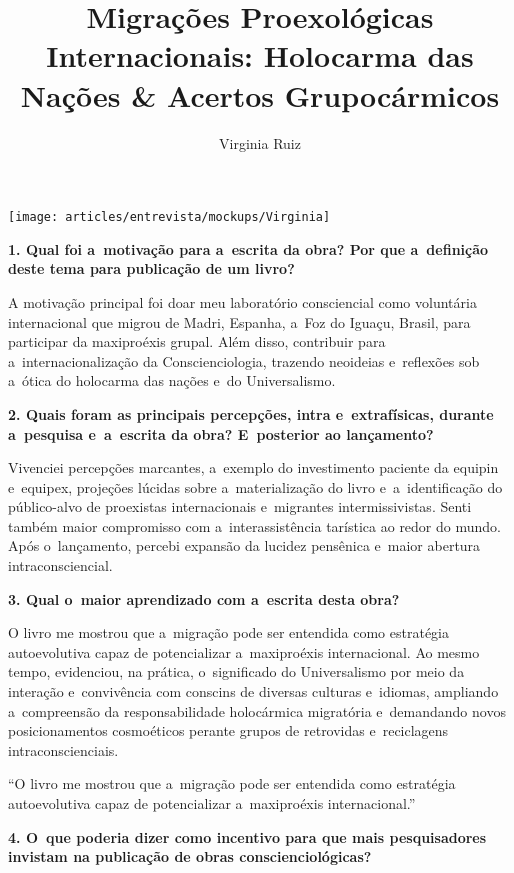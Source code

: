 \documentclass{gescons}
\author{Virginia Ruiz}
\title{Migrações Proexológicas Internacionais: Holocarma das Nações \& Acertos Grupocármicos}
\begin{document}
    \makeentrevistatitle

    \begin{multicols}{2}


\begin{center}
    \texttt{[image: articles/entrevista/mockups/Virginia]}
\end{center}


\textbf{1.       Qual foi a~motivação para a~escrita da obra? Por que a~definição deste tema para publicação de um livro?}

A motivação principal foi doar meu laboratório consciencial como voluntária internacional que migrou de Madri, Espanha, a~Foz do Iguaçu, Brasil, para participar da maxiproéxis grupal. Além disso, contribuir para a~internacionalização da Conscienciologia, trazendo neoideias e~reflexões sob a~ótica do holocarma das nações e~do Universalismo.


\textbf{2.       Quais foram as principais percepções, intra e~extrafísicas, durante a~pesquisa e~a~escrita da obra? E~posterior ao lançamento?}

Vivenciei percepções marcantes, a~exemplo do investimento paciente da equipin e~equipex, projeções lúcidas sobre a~materialização do livro e~a~identificação do público-alvo de proexistas internacionais e~migrantes intermissivistas. Senti também maior compromisso com a~interassistência tarística ao redor do mundo. Após o~lançamento, percebi expansão da lucidez pensênica e~maior abertura intraconsciencial.


\textbf{3.       Qual o~maior aprendizado com a~escrita desta obra?}

O livro me mostrou que a~migração pode ser entendida como estratégia autoevolutiva capaz de potencializar a~maxiproéxis internacional. Ao mesmo tempo, evidenciou, na prática, o~significado do Universalismo por meio da interação e~convivência com conscins de diversas culturas e~idiomas, ampliando a~compreensão da responsabilidade holocármica migratória e~demandando novos posicionamentos cosmoéticos perante grupos de retrovidas e~reciclagens intraconscienciais.

\begin{pullquote}
    ``O livro me mostrou que a~migração pode ser entendida como estratégia autoevolutiva capaz de potencializar a~maxiproéxis internacional.''
\end{pullquote}

\textbf{4.       O~que poderia dizer como incentivo para que mais pesquisadores invistam na publicação de obras conscienciológicas?}


\end{multicols}
\end{document}
